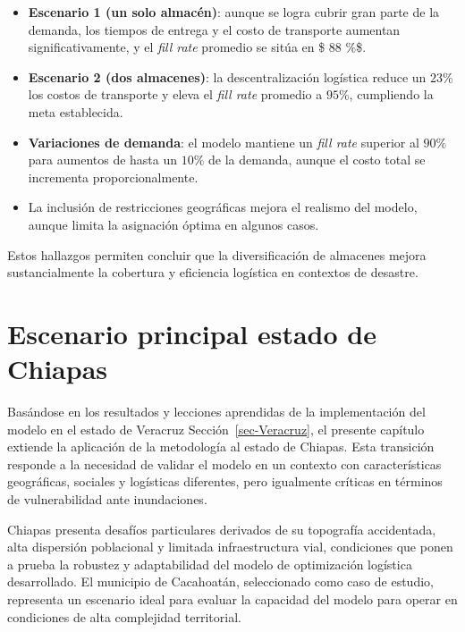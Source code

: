 \documentclass[
  spanish,
  us-letterpaper,
]{scrreprt}
\providecommand{\tightlist}{%
  \setlength{\itemsep}{0pt}\setlength{\parskip}{0pt}}
\numberwithin{equation}{section}
\begin{document}
\begin{itemize}
\tightlist
\item
  \textbf{Escenario 1 (un solo almacén)}: aunque se logra cubrir gran
  parte de la demanda, los tiempos de entrega y el costo de transporte
  aumentan significativamente, y el \emph{fill rate} promedio se sitúa
  en \$ 88 \%\$.
\item
  \textbf{Escenario 2 (dos almacenes)}: la descentralización logística
  reduce un \(23 \%\) los costos de transporte y eleva el \emph{fill
  rate} promedio a \(95 \%\), cumpliendo la meta establecida.
\item
  \textbf{Variaciones de demanda}: el modelo mantiene un \emph{fill
  rate} superior al \(90 \%\) para aumentos de hasta un \(10 \%\) de la
  demanda, aunque el costo total se incrementa proporcionalmente.
\item
  La inclusión de restricciones geográficas mejora el realismo del
  modelo, aunque limita la asignación óptima en algunos casos.
\end{itemize}

Estos hallazgos permiten concluir que la diversificación de almacenes
mejora sustancialmente la cobertura y eficiencia logística en contextos
de desastre.


\chapter{Escenario principal estado de
Chiapas}\label{escenario-principal-estado-de-chiapas}

Basándose en los resultados y lecciones aprendidas de la implementación
del modelo en el estado de Veracruz Sección~\ref{sec-Veracruz}, el
presente capítulo extiende la aplicación de la metodología al estado de
Chiapas. Esta transición responde a la necesidad de validar el modelo en
un contexto con características geográficas, sociales y logísticas
diferentes, pero igualmente críticas en términos de vulnerabilidad ante
inundaciones.

Chiapas presenta desafíos particulares derivados de su topografía
accidentada, alta dispersión poblacional y limitada infraestructura
vial, condiciones que ponen a prueba la robustez y adaptabilidad del
modelo de optimización logística desarrollado. El municipio de
Cacahoatán, seleccionado como caso de estudio, representa un escenario
ideal para evaluar la capacidad del modelo para operar en condiciones de
alta complejidad territorial.
\end{document}

